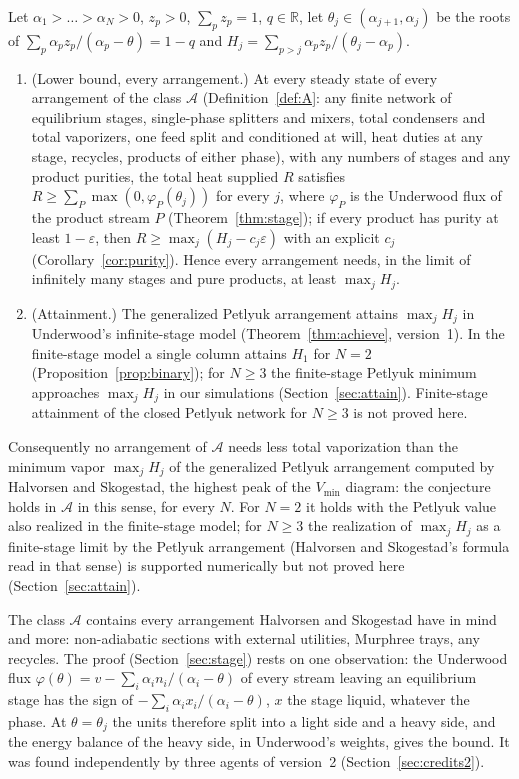 \begin{theorem}\label{thm:main2}
Let $\alpha_1>\dots>\alpha_N>0$, $z_p>0$, $\sum_pz_p=1$, $q\in\mathbb R$, let $\theta_j\in(\alpha_{j+1},\alpha_j)$ be the roots of
$\sum_p\alpha_pz_p/(\alpha_p-\theta)=1-q$ and $H_j=\sum_{p>j}\alpha_pz_p/(\theta_j-\alpha_p)$.
\begin{enumerate}
\item (Lower bound, every arrangement.) At every steady state of every arrangement of the class $\mathcal A$
(Definition~\ref{def:A}: any finite network of equilibrium stages, single-phase splitters and mixers, total condensers
and total vaporizers, one feed split and conditioned at will, heat duties at any stage, recycles, products of either
phase), with any numbers of stages and any product purities, the total heat supplied $R$ satisfies
$R\ge\sum_P\max(0,\varphi_P(\theta_j))$ for every $j$, where $\varphi_P$ is the Underwood flux of the product stream $P$
(Theorem~\ref{thm:stage}); if every product has purity at least $1-\varepsilon$, then $R\ge\max_j(H_j-c_j\varepsilon)$ with
an explicit $c_j$ (Corollary~\ref{cor:purity}). Hence every arrangement needs, in the limit of infinitely many stages and
pure products, at least $\max_jH_j$.
\item (Attainment.) The generalized Petlyuk arrangement attains $\max_jH_j$ in Underwood's infinite-stage model
(Theorem~\ref{thm:achieve}, version~1). In the finite-stage model a single column attains $H_1$ for $N=2$
(Proposition~\ref{prop:binary}); for $N\ge3$ the finite-stage Petlyuk minimum approaches $\max_jH_j$ in our simulations
(Section~\ref{sec:attain}). Finite-stage attainment of the closed Petlyuk network for $N\ge3$ is not proved here.
\end{enumerate}
Consequently no arrangement of $\mathcal A$ needs less total vaporization than the minimum vapor $\max_jH_j$ of the
generalized Petlyuk arrangement computed by Halvorsen and Skogestad, the highest peak of the $V_{\min}$ diagram: the
conjecture holds in $\mathcal A$ in this sense, for every $N$. For $N=2$ it holds with the Petlyuk value also realized in
the finite-stage model; for $N\ge3$ the realization of $\max_jH_j$ as a finite-stage limit by the Petlyuk arrangement
(Halvorsen and Skogestad's formula read in that sense) is supported numerically but not proved here
(Section~\ref{sec:attain}).
\end{theorem}

The class $\mathcal A$ contains every arrangement Halvorsen and Skogestad have in mind and more: non-adiabatic sections
with external utilities, Murphree trays, any recycles. The proof (Section~\ref{sec:stage}) rests on one observation:
the Underwood flux $\varphi(\theta)=v-\sum_i\alpha_in_i/(\alpha_i-\theta)$ of every stream leaving an equilibrium stage has
the sign of $-\sum_i\alpha_ix_i/(\alpha_i-\theta)$, $x$ the stage liquid, whatever the phase. At $\theta=\theta_j$ the units
therefore split into a light side and a heavy side, and the energy balance of the heavy side, in Underwood's weights,
gives the bound. It was found independently by three agents of version~2 (Section~\ref{sec:credits2}).

